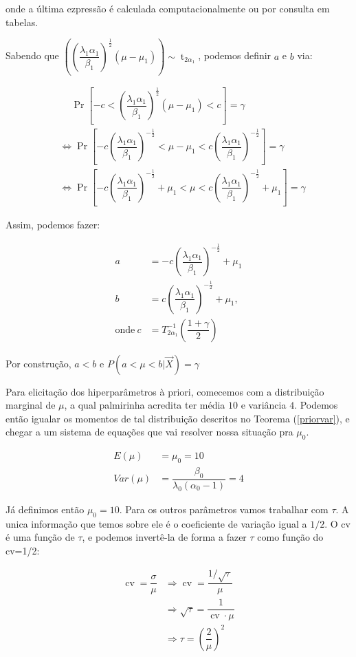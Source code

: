 \documentclass[a4paper]{article}
\newcommand{\op}[1]{{\operatorname{#1}}}
\newcommand{\vX}{\vec X}
\begin{document}
onde a última ezpressão é calculada computacionalmente ou por consulta em tabelas.

Sabendo que $\left(\left(\dfrac{\lambda_1\alpha_1}{\beta_1}\right)^{\frac12}(\mu-\mu_1)\right)\sim \op{t}_{2\alpha_1}$, podemos definir $a$ e $b$ via:

\begin{align*}
&~~~\;\;\op{Pr}\left[-c<\left(\dfrac{\lambda_1\alpha_1}{\beta_1}\right)^{\frac12}(\mu-\mu_1)<c\right]=\gamma\\
&\Leftrightarrow \op{Pr}\left[ -c\left(\dfrac{\lambda_1\alpha_1}{\beta_1}\right)^{-\frac12}<\mu-\mu_1<c\left(\dfrac{\lambda_1\alpha_1}{\beta_1}\right)^{-\frac12}\right]=\gamma\\
&\Leftrightarrow \op{Pr}\left[ -c\left(\dfrac{\lambda_1\alpha_1}{\beta_1}\right)^{-\frac12}+\mu_1<\mu<c\left(\dfrac{\lambda_1\alpha_1}{\beta_1}\right)^{-\frac12}+\mu_1\right]=\gamma
\end{align*}

Assim, podemos fazer:

\begin{align*}
	a&=-c\left(\dfrac{\lambda_1\alpha_1}{\beta_1}\right)^{-\frac12}+\mu_1\\
	b&=c\left(\dfrac{\lambda_1\alpha_1}{\beta_1}\right)^{-\frac12}+\mu_1,\\
	\text{onde} ~c&=T^{-1}_{2\alpha_1}\left(\dfrac{1+\gamma}{2}\right)
\end{align*}

Por construção, $a<b$ e $P(a<\mu<b|\vX)=\gamma$

Para elicitação dos hiperparâmetros à priori, comecemos com a distribuição marginal de $\mu$, a qual palmirinha acredita ter média $10$ e variância $4$. Podemos então igualar os momentos de tal distribuição descritos no Teorema (\ref{priorvar}), e chegar a um sistema de equações que vai resolver nossa situação pra $\mu_0$.

\begin{align*}E(\mu)&=\mu_0=10\\
Var(\mu)&=\dfrac{\beta_0}{\lambda_0(\alpha_0-1)}=4\end{align*}

Já definimos então $\mu_0=10$. Para os outros parâmetros vamos trabalhar com $\tau$. A unica informação que temos sobre ele é o coeficiente de variação igual a $1/2$. O cv é uma função de $\tau$, e podemos invertê-la de forma a fazer $\tau$ como função do cv=1/2:

\begin{align}\op{cv}=\dfrac{\sigma}{\mu}&\Rightarrow \op{cv}=\dfrac{1/\sqrt{\tau}}{\mu}\nonumber\\ &\Rightarrow\sqrt{\tau}=\dfrac{1}{\op{cv}\cdot\mu}\nonumber\\
&\Rightarrow\tau=\left(\dfrac{2}{\mu}\right)^2\nonumber\end{align}
\end{document}
